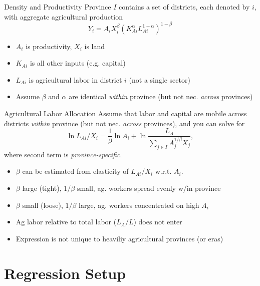 \documentclass[10pt, xcolor=dvipsnames]{beamer}
\begin{document}
\begin{frame}{Density and Productivity}
Province $I$ contains a set of districts, each denoted by $i$, with aggregate agricultural production
\begin{equation}
Y_{i} = A_{i} X_{i}^{\beta} \left(K_{Ai}^{\alpha}L_{Ai}^{1-\alpha}\right)^{1-\beta} \label{EQ_production}
\end{equation}
\begin{itemize}
  \item $A_i$ is productivity, $X_i$ is land
  \item $K_{Ai}$ is all other inputs (e.g. capital)
  \item $L_{Ai}$ is agricultural labor in district $i$ (not a single sector)
  \item Assume $\beta$ and $\alpha$ are identical \textit{within} province (but not nec. \textit{across} provinces)
\end{itemize}
\end{frame}

\begin{frame}{Agricultural Labor Allocation}
Assume that labor and capital are mobile across districts \textit{within} province (but not nec. \textit{across} provinces), and you can solve for
\begin{equation}
\ln L_{Ai}/X_i = \frac{1}{\beta} \ln A_{i} + \ln \frac{L_A}{\sum_{j\in I} A_{j}^{1/\beta}X_{j}}, \label{EQ_est}
\end{equation}
where second term is \textit{province-specific}. 

\begin{itemize}
  \item $\beta$ can be estimated from elasticity of $L_{Ai}/X_i$ w.r.t. $A_i$. 
  \item $\beta$ large (tight), $1/\beta$ small, ag. workers spread evenly w/in province
  \item $\beta$ small (loose), $1/\beta$ large, ag. workers concentrated on high $A_i$
  \item Ag labor relative to total labor ($L_A/L$) does not enter
  \item Expression is not unique to heaviliy agricultural provinces (or eras)
\end{itemize}

\hfill \hyperlink{extend}{}
\end{frame}

\section{Regression Setup}
\end{document}
